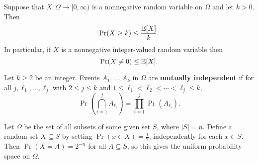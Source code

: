 \begin{definition}
    Suppose that \(X: \Omega \to [0, \infty)\) is a nonnegative random variable on \(\Omega\) and let \(k > 0\). Then
    \[\Pr(X \geq k) \leq \frac{\mathbb{E}[X]}{k}.\]
    In particular, if \(X\) is a nonnegative integer-valued random variable then
    \[\Pr(X \neq 0) \leq \mathbb{E}[X].\]
\end{definition}

Let \(k \geq 2\) be an integer. Events \(A_1, \dots, A_k\) in \(\Omega\) are \textbf{mutually independent} if for all \(j, \ell_1, \dots, \ell_j\) with \(2 \leq j \leq k\) and \(1 \leq \ell_1 < \ell_2 < \cdots < \ell_j \leq k\),
\[\Pr\left(\bigcap_{i=1}^j A_{\ell_i}\right) = \prod_{i = 1}^j \Pr(A_{\ell_i}).\]

\begin{lemma}
    Let \(\Omega\) be the set of all subsets of some given set \(S\), where \(|S| = n\). Define a random set \(X \subseteq S\) by setting \(\Pr(x \in X) = \frac{1}{2}\), independently for each \(x \in S\). Then \(\Pr(X = A) = 2^{-n}\) for all \(A \subseteq S\), so this gives the uniform probability space on \(\Omega\).
\end{lemma}

